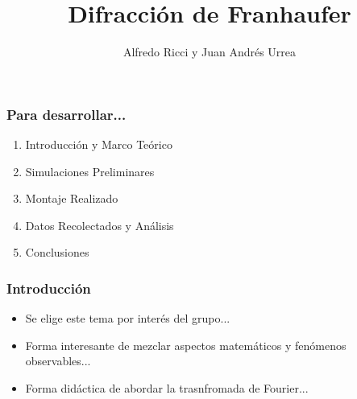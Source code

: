 \documentclass[12pt]{beamer}
\title{Difracción de Franhaufer}
\author{Alfredo Ricci y Juan Andrés Urrea}
\begin{document}
\frame{\titlepage}
\begin{frame}
\frametitle{Para desarrollar...}
\begin{block}{}
\begin{enumerate}
\item Introducción y Marco Teórico \pause
\item Simulaciones Preliminares \pause
\item Montaje Realizado \pause
\item Datos Recolectados y Análisis \pause
\item Conclusiones
\end{enumerate}
\end{block}
\end{frame}

\begin{frame}
\frametitle{Introducción}
\begin{block}{}
\begin{itemize}
\item Se elige este tema por interés del grupo... \pause
\item Forma interesante de mezclar aspectos matemáticos y fenómenos observables... \pause
\item Forma didáctica de abordar la trasnfromada de Fourier...
\end{itemize}
\end{block}
\end{frame}
\end{document}
